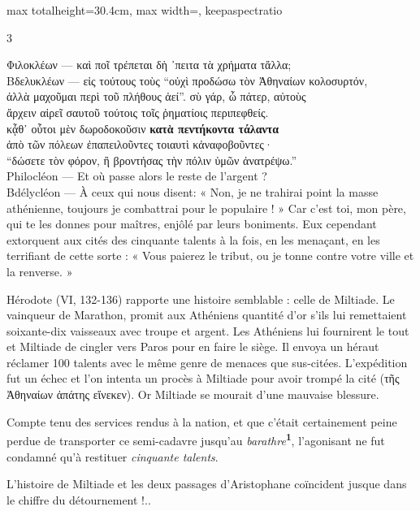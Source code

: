 \documentclass[11pt,twoside]{book}
\newcommand{\italique}[1]{\textit{#1}}
\newcommand{\citComm}[1]{\begin{quoting}[vskip=0.4pt,leftmargin=0.7em,rightmargin=0.2em]#1\end{quoting}}
\newcommand{\francais}[1]{{\policeFr #1}}
\newcommand{\marqueur}[1]{\textsuperscript{\color{rubricRed}\textbf{#1}}}
\begin{document}
\begin{adjustbox}{max totalheight=30.4cm, max width=\textwidth, keepaspectratio}
\begin{minipage}{\textwidth}
{\begin{multicols}{3}
\citComm{Φιλοκλέων --- καὶ ποῖ τρέπεται δὴ ᾽πειτα τὰ χρήματα τἄλλα;\\
Βδελυκλέων --- εἰς τούτους τοὺς “οὐχὶ προδώσω τὸν Ἀθηναίων κολοσυρτόν,\\
ἀλλὰ μαχοῦμαι περὶ τοῦ πλήθους ἀεί”. σὺ γάρ, ὦ πάτερ, αὐτοὺς\\
ἄρχειν αἱρεῖ σαυτοῦ τούτοις τοῖς ῥηματίοις περιπεφθείς.\\
κᾆθ᾽ οὗτοι μὲν δωροδοκοῦσιν \textbf{κατὰ πεντήκοντα τάλαντα}\\
ἀπὸ τῶν πόλεων ἐπαπειλοῦντες τοιαυτὶ κἀναφοβοῦντες·\\
“δώσετε τὸν φόρον, ἢ βροντήσας τὴν πόλιν ὑμῶν ἀνατρέψω.”\\
Philocléon --- \francais{Et où passe alors le reste de l'argent ?}\\
Bdélycléon --- \francais{À ceux qui nous disent: « Non, je ne trahirai point la masse athénienne, toujours je combattrai pour le populaire ! » Car c'est toi, mon père, qui te les donnes pour maîtres, enjôlé par leurs boniments. Eux cependant extorquent aux cités des cinquante talents à la fois, en les menaçant, en les terrifiant de cette sorte : « Vous paierez le tribut, ou je tonne contre votre ville et la renverse. »}}
\par\vspace{1.5pt}
\noindent Hérodote (VI, 132-136) rapporte une histoire semblable : celle de Miltiade. Le vainqueur de Marathon, promit aux Athéniens quantité d'or s'ils lui remettaient soixante-dix vaisseaux avec troupe et argent. Les Athéniens lui fournirent le tout et Miltiade de cingler vers Paros pour en faire le siège. Il envoya un héraut réclamer 100 talents avec le même genre de menaces que sus-citées. L'expédition fut un échec et l'on intenta un procès à Miltiade pour avoir trompé la cité (τῆς Ἀθηναίων ἀπάτης εἵνεκεν). Or Miltiade se mourait d'une mauvaise blessure.
\par\vspace{1.5pt}
\noindent Compte tenu des services rendus à la nation, et que c'était certainement peine perdue de transporter ce semi-cadavre jusqu'au \italique{barathre}\marqueur{1}, l'agonisant ne fut condamné qu'à restituer \italique{cinquante talents}.
\par\vspace{1.5pt}
\noindent L'histoire de Miltiade et les deux passages d'Aristophane coïncident jusque dans le chiffre du détournement !..
\par\vspace{1.5pt}

\end{multicols}}
\end{minipage}
\end{adjustbox}
\end{document}
